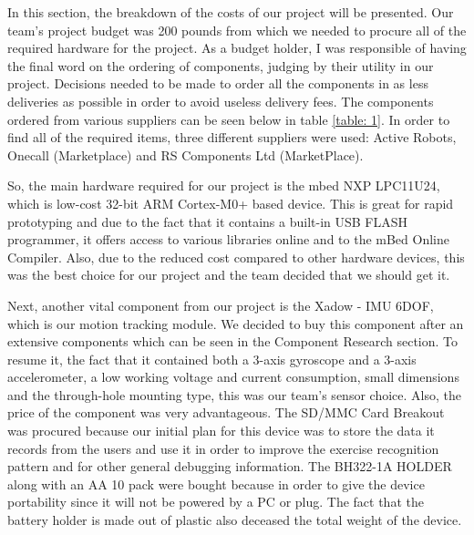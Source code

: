 In this section, the breakdown of the costs of our project will be presented. Our team's project budget was 200 pounds from which we needed to procure all of the required hardware for the project. As a budget holder, I was responsible of having the final word on the ordering of components, judging by their utility in our project. Decisions needed to be made to order all the components in as less deliveries as possible in order to avoid useless delivery fees. The components ordered from various suppliers can be seen below in table \ref{table: 1}. In order to find all of the required items, three different suppliers were used: Active Robots, Onecall (Marketplace) and RS Components Ltd (MarketPlace).

So, the main hardware required for our project is the mbed NXP LPC11U24, which is low-cost 32-bit ARM Cortex-M0+ based device. This is great for rapid prototyping and due to the fact that it contains a built-in USB FLASH programmer, it offers access to various libraries online and to the mBed Online Compiler. Also, due to the  reduced cost compared to other hardware devices, this was the best choice for our project and the team decided that we should get it. 

Next, another vital component from our project is the Xadow - IMU 6DOF, which is our motion tracking module. We decided to buy this component after an extensive components which can be seen in the Component Research section. To resume it, the fact that it contained both a 3-axis gyroscope and a 3-axis accelerometer, a low working voltage and current consumption, small dimensions and the through-hole mounting type, this was our team's sensor choice. Also, the price of the component was very advantageous. The SD/MMC Card Breakout was procured because our initial plan for this device was to store the data it records from the users and use it in order to improve the exercise recognition pattern and for other general debugging information. The BH322-1A  HOLDER along with an AA 10 pack were bought because in order to give the device portability since it will not be powered by a PC or plug. The fact that the battery holder is made out of plastic also deceased the total weight of the device.

